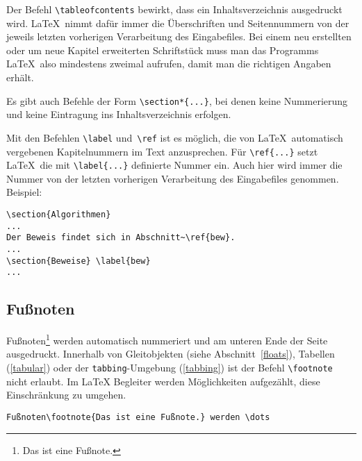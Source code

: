 Der Befehl \lstinline|\tableofcontents| bewirkt, dass ein
Inhaltsverzeichnis ausgedruckt wird.
\LaTeX\ nimmt dafür immer die Überschriften und Seitennummern
von der jeweils letzten vorherigen Verarbeitung des Eingabefiles.
Bei einem neu erstellten oder um neue Kapitel erweiterten
Schriftstück muss man das Programms \LaTeX\ also mindestens
zweimal aufrufen, damit man die richtigen Angaben erhält.

Es gibt auch Befehle der Form \lstinline|\section*{...}|, bei denen
keine Nummerierung und keine Eintragung ins Inhaltsverzeichnis
erfolgen.

Mit den Befehlen \lstinline|\label| und~\lstinline|\ref| ist es möglich,
die von \LaTeX\ automatisch vergebenen Kapitelnummern im Text
anzusprechen.
Für \lstinline|\ref{...}| setzt \LaTeX\ die
mit \lstinline|\label{...}| definierte Nummer ein.
Auch hier wird immer die Nummer von der letzten vorherigen
Verarbeitung des Eingabefiles genommen.
Beispiel:
\begin{beispiel}
\begin{lstlisting}
\section{Algorithmen}
...
Der Beweis findet sich in Abschnitt~\ref{bew}.
...
\section{Beweise} \label{bew}
...
\end{lstlisting}
 \end{beispiel}

\subsection{Fußnoten}

Fußnoten\footnote{Das  ist eine Fußnote.} werden automatisch nummeriert und am
unteren Ende der Seite ausgedruckt.   Innerhalb von Gleitobjekten (siehe
Abschnitt~\ref{floats}),  Tabellen (\ref{tabular}) oder der
\texttt{tabbing}-Umgebung (\ref{tabbing}) ist der Befehl \lstinline|\footnote|
nicht erlaubt. Im \LaTeX{} Begleiter\cite{wonne} werden Möglichkeiten aufgezählt, diese
Einschränkung zu umgehen.

\begin{beispiel}
\begin{lstlisting}
Fußnoten\footnote{Das ist eine Fußnote.} werden \dots
\end{lstlisting}
\end{beispiel}


